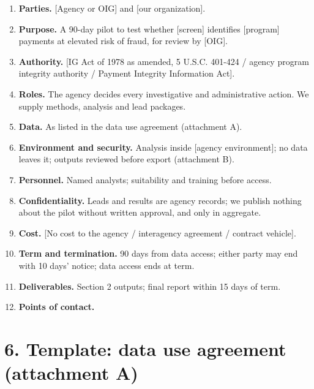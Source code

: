 \documentclass[letterpaper,11pt]{article}
\providecommand{\tightlist}{\setlength{\itemsep}{0pt}\setlength{\parskip}{0pt}}
\begin{document}
\begin{enumerate}
\def\labelenumi{\arabic{enumi}.}
\tightlist
\item
  \textbf{Parties.} {[}Agency or OIG{]} and {[}our organization{]}.
\item
  \textbf{Purpose.} A 90-day pilot to test whether {[}screen{]}
  identifies {[}program{]} payments at elevated risk of fraud, for
  review by {[}OIG{]}.
\item
  \textbf{Authority.} {[}IG Act of 1978 as amended, 5 U.S.C. 401-424 /
  agency program integrity authority / Payment Integrity Information
  Act{]}.
\item
  \textbf{Roles.} The agency decides every investigative and
  administrative action. We supply methods, analysis and lead packages.
\item
  \textbf{Data.} As listed in the data use agreement (attachment A).
\item
  \textbf{Environment and security.} Analysis inside {[}agency
  environment{]}; no data leaves it; outputs reviewed before export
  (attachment B).
\item
  \textbf{Personnel.} Named analysts; suitability and training before
  access.
\item
  \textbf{Confidentiality.} Leads and results are agency records; we
  publish nothing about the pilot without written approval, and only in
  aggregate.
\item
  \textbf{Cost.} {[}No cost to the agency / interagency agreement /
  contract vehicle{]}.
\item
  \textbf{Term and termination.} 90 days from data access; either party
  may end with 10 days' notice; data access ends at term.
\item
  \textbf{Deliverables.} Section 2 outputs; final report within 15 days
  of term.
\item
  \textbf{Points of contact.}
\end{enumerate}

\hypertarget{template-data-use-agreement-attachment-a}{%
\section*{6. Template: data use agreement (attachment
A)}\label{template-data-use-agreement-attachment-a}}
\end{document}
